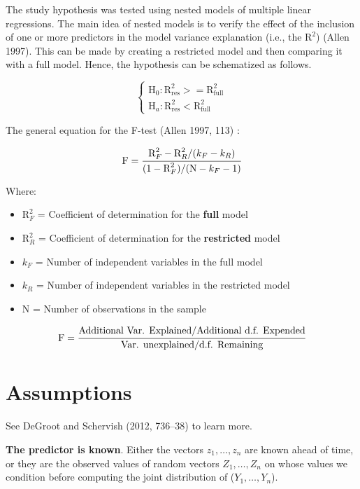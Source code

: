 \documentclass[
  12pt,
  a4paper,
  oneside]{tesesusp}
\providecommand{\tightlist}{%
  \setlength{\itemsep}{0pt}\setlength{\parskip}{0pt}}\usepackage{longtable,booktabs,array}
\begin{document}
The study hypothesis was tested using nested models of multiple linear
regressions. The main idea of nested models is to verify the effect of
the inclusion of one or more predictors in the model variance
explanation (i.e., the \(\text{R}^{2}\)) (Allen 1997). This can be made
by creating a restricted model and then comparing it with a full model.
Hence, the hypothesis can be schematized as follows.

\[
\begin{cases}
\text{H}_{0}: \text{R}^{2}_{\text{res}} >= \text{R}^{2}_{\text{full}} \\
\text{H}_{a}: \text{R}^{2}_{\text{res}} < \text{R}^{2}_{\text{full}}
\end{cases}
\]

The general equation for the F-test (Allen 1997, 113) :

\[
\text{F} = \cfrac{\text{R}^{2}_{F} - \text{R}^{2}_{R} / (k_{F} - k_{R})}{(1 - \text{R}^{2}_{F}) / (\text{N} - k_{F} - 1)}
\]

Where:

\begin{itemize}
\tightlist
\item
  \(\text{R}^{2}_{F}\) = Coefficient of determination for the
  \textbf{full} model
\item
  \(\text{R}^{2}_{R}\) = Coefficient of determination for the
  \textbf{restricted} model
\item
  \(k_{F}\) = Number of independent variables in the full model
\item
  \(k_{R}\) = Number of independent variables in the restricted model
\item
  \(\text{N}\) = Number of observations in the sample
\end{itemize}

\[
\text{F} = \cfrac{\text{Additional Var. Explained} / \text{Additional d.f. Expended}}{\text{Var. unexplained} / \text{d.f. Remaining}}
\]

\hypertarget{assumptions}{%
\section{Assumptions}\label{assumptions}}

See DeGroot and Schervish (2012, 736--38) to learn more.

\begin{tcolorbox}[enhanced jigsaw, breakable, colback=white, colbacktitle=quarto-callout-warning-color!10!white, leftrule=.75mm, left=2mm, toprule=.15mm, opacityback=0, rightrule=.15mm, title=\textcolor{quarto-callout-warning-color}{\faExclamationTriangle}\hspace{0.5em}{Warning}, opacitybacktitle=0.6, bottomtitle=1mm, titlerule=0mm, toptitle=1mm, coltitle=black, colframe=quarto-callout-warning-color-frame, bottomrule=.15mm, arc=.35mm]

\textbf{The predictor is known}. Either the vectors
\(z_{1}, \dots , z_{n}\) are known ahead of time, or they are the
observed values of random vectors \(Z_{1}, \dots , Z_{n}\) on whose
values we condition before computing the joint distribution of
(\(Y_{1}, \dots , Y_{n}\)).

\end{tcolorbox}
\end{document}
